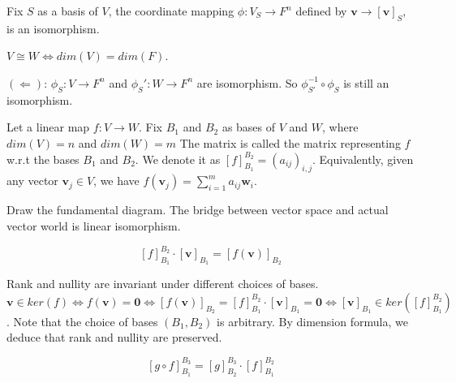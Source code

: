 \documentclass[12pt]{article}
\begin{document}
\begin{theorem}
    Fix $S$ as a basis of $V$, the coordinate mapping $\phi: V_S\rightarrow F^n$ defined by $\mathbf{v}\rightarrow [\mathbf{v}]_S$, is an isomorphism.
\end{theorem}

\begin{theorem}
    $V\cong W\Leftrightarrow dim(V)=dim(F)$.
\end{theorem}


\begin{pfbox}
$(\Leftarrow)$: $\phi_S: V\rightarrow F^n$ and $\phi_S': W\rightarrow F^n$  are isomorphism. So $\phi^{-1}_{S'}\circ\phi_S$ is still an isomorphism.
\end{pfbox}    



\begin{definition}
    Let a linear map $f:V\rightarrow W$. Fix $B_1$ and $B_2$ as bases of $V$ and $W$, where $dim(V)=n$ and $dim(W)=m$
    The matrix is called the matrix representing $f$ w.r.t the bases $B_1$ and $B_2$.
    We denote it as $[f]^{B_2}_{B_1}=(a_{ij})_{i,j}$. Equivalently, given any vector $\mathbf{v}_j\in V$, we have $f(\mathbf{v}_j)=\sum_{i=1}^{m}a_{ij}\mathbf{w}_i$.
\end{definition}

Draw the fundamental diagram. The bridge between vector space and actual vector world is linear isomorphism.

\begin{theorem}
    \[[f]^{B_2}_{B_1}\cdot [\mathbf{v}]_{B_1} = [f(\mathbf{v})]_{B_2}\]
\end{theorem}

\begin{corollary}
    Rank and nullity are invariant under different choices of bases.
    $\mathbf{v}\in ker(f) \Leftrightarrow f(\mathbf{v})=\mathbf{0} \Leftrightarrow [f(\mathbf{v})]_{B_2} = [f]^{B_2}_{B_1}\cdot [\mathbf{v}]_{B_1} = \mathbf{0} \Leftrightarrow [\mathbf{v}]_{B_1} \in ker([f]^{B_2}_{B_1})$.
    Note that the choice of bases $(B_1, B_2)$ is arbitrary. By dimension formula, we deduce that rank and nullity are preserved.
\end{corollary}



\begin{theorem}
    \[[g\circ f]^{B_3}_{B_1} =  [g]^{B_3}_{B_2} \cdot [f]^{B_2}_{B_1}\]
\end{theorem}
\end{document}
